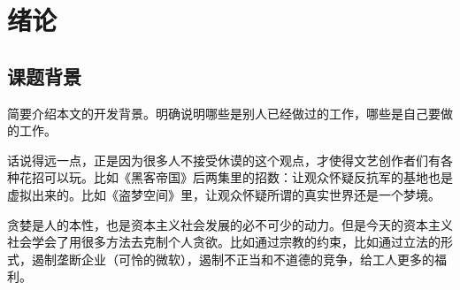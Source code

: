 
\clearpage
\setcounter{page}{1} 

\chapter{绪论}

\section{课题背景}\label{sec:background}
简要介绍本文的开发背景。明确说明哪些是别人已经做过的工作，哪些是自己要做的工作。

话说得远一点，正是因为很多人不接受休谟的这个观点，才使得文艺创作者们有各种花招可以玩。比如《黑客帝国》后两集里的招数：让观众怀疑反抗军的基地也是虚拟出来的。比如《盗梦空间》里，让观众怀疑所谓的真实世界还是一个梦境。

贪婪是人的本性，也是资本主义社会发展的必不可少的动力。但是今天的资本主义社会学会了用很多方法去克制个人贪欲。比如通过宗教的约束，比如通过立法的形式，遏制垄断企业（可怜的微软），遏制不正当和不道德的竞争，给工人更多的福利\cite{chen2005laser, mittelbach2004latex, zhen2018leave}。

